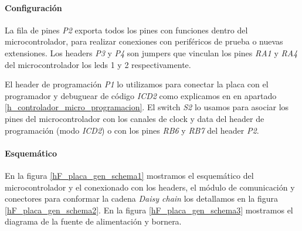 \paragraph{Configuraci\'on}
\label{h_placas_generica_config}

La fila de pines \emph{P2} exporta todos los pines con funciones dentro del microcontrolador, para realizar
conexiones con perif\'ericos de prueba o nuevas extensiones.
Los headers \emph{P3} y \emph{P4} son jumpers que vinculan los pines \emph{RA1} y \emph{RA4} del
microcontrolador los leds 1 y 2 respectivamente.

El header de programaci\'on \emph{P1} lo utilizamos para conectar la placa con el programador y debuguear
de c\'odigo \emph{ICD2} como explicamos en en apartado \ref{h_controlador_micro_programacion}.
El switch \emph{S2} lo usamos para asociar los pines del microcontrolador con los canales de clock
y data del header de programaci\'on (modo \emph{ICD2}) o con los pines \emph{RB6} y \emph{RB7 }del header
\emph{P2}.

\paragraph{Esquem\'atico}
\label{h_placas_generica_esquematicos}

En la figura \ref{hF_placa_gen_schema1} mostramos el esquem\'atico del microcontrolador y el conexionado
con los headers, el m\'odulo de comunicaci\'on y conectores para conformar la cadena \emph{Daisy chain}
los detallamos en la figura \ref{hF_placa_gen_schema2}.
En la figura \ref{hF_placa_gen_schema3} mostramos el diagrama de la fuente de alimentaci\'on y bornera.

